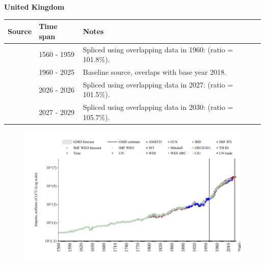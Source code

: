 \documentclass[12pt,a4paper,landscape]{article}
\begin{document}
\begin{adjustbox}{max totalsize={\paperwidth}{\paperheight},center}
\begin{minipage}[t][\textheight][t]{\textwidth}
\vspace*{0.5cm}
{}
\begin{center}
{\Large\bfseries United Kingdom}
\end{center}
\vspace{0.5cm}
\begin{table}[H]
\centering
\small
\begin{tabular}{|l|l|l|}
\hline
\textbf{Source} & \textbf{Time span} & \textbf{Notes} \\
\hline
\rowcolor{white}\cite{CS1_GBR}& 1560 - 1959 &Spliced using overlapping data in 1960: (ratio = 101.8\%).\\
\rowcolor{lightgray}\cite{OECD_EO}& 1960 - 2025 &Baseline source, overlaps with base year 2018.\\
\rowcolor{white}\cite{AMECO}& 2026 - 2026 &Spliced using overlapping data in 2027: (ratio = 101.5\%).\\
\rowcolor{lightgray}\cite{IMF_WEO_forecast}& 2027 - 2029 &Spliced using overlapping data in 2030: (ratio = 105.7\%).\\
\hline
\end{tabular}
\end{table}
\begin{figure}[H]
\centering
\includegraphics[width=\textwidth,height=0.6\textheight,keepaspectratio]{graphs/GBR_imports.pdf}
\end{figure}
\end{minipage}
\end{adjustbox}
\end{document}
